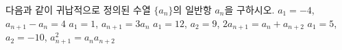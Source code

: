다음과 같이 귀납적으로 정의된 수열 $\{a_n\}$의 일반항 $a_n$을 구하시오. 
 $a_1=-4$, $a_{n+1}-a_n=4$
 $a_1=1$, $a_{n+1}=3a_n$
 $a_1=12$, $a_2=9$, $2a_{n+1}=a_n+a_{n+2}$
 $a_1=5$, $a_2=-10$, $a_{n+1}^2=a_na_{n+2}$
